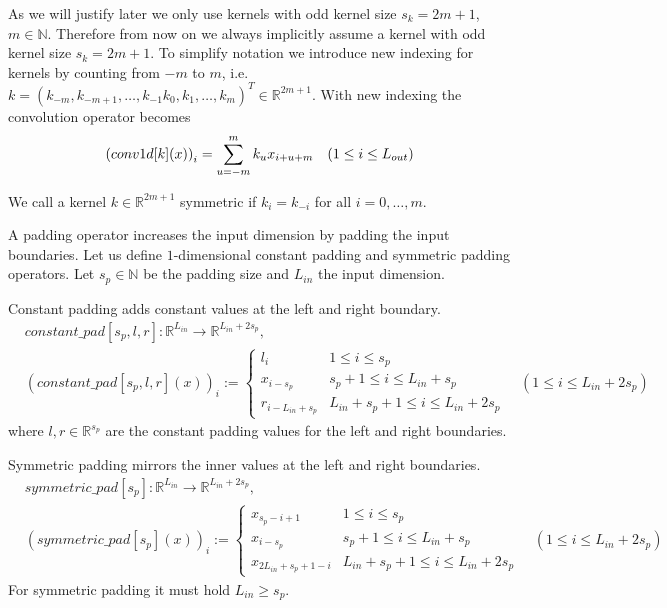 \documentclass[twoside,a4paper]{article}
\begin{document}
As we will justify later we only use kernels with odd kernel size $s_k = 2m+1$, $m \in \mathbb{N}$.
Therefore from now on we always implicitly assume a kernel with odd kernel size $s_k = 2m+1$.
To simplify notation we introduce new indexing for kernels by counting from $-m$ to $m$,
i.e. $k = (k_{-m}, k_{-m+1}, \dots, k_{-1} k_0, k_1, \dots, k_{m})^T \in \mathbb{R}^{2m+1}$.
With new indexing the convolution operator becomes 
\begin{equation*}
	\left( conv1d[k](x) \right)_i = \sum_{u=-m}^{m} k_u x_{i+u+m} \quad
	(1 \leq i \leq L_{out})
\end{equation*}

We call a kernel $k \in \mathbb{R}^{2m+1}$ symmetric if $k_i = k_{-i}$ for all $i = 0, \dots, m$.

A padding operator increases the input dimension by padding
the input boundaries. Let us define $1$-dimensional constant padding and symmetric padding operators.
Let $s_p \in \mathbb{N}$ be the padding size and $L_{in}$ the input dimension.

Constant padding adds constant values at the left and right boundary.
\begin{align*}
	&constant\_pad[s_p,l,r] : \mathbb{R}^{L_{in}} \to \mathbb{R}^{L_{in}+2s_p}, \\[7pt]
	&(constant\_pad[s_p,l,r](x))_i :=
	\begin{cases}
		l_i & 1 \leq i \leq s_p \\
		x_{i-s_p} & s_p+1 \leq i \leq L_{in}+s_p \\
		r_{i-L_{in}+s_p} & L_{in}+s_p+1 \leq i \leq L_{in} + 2s_p
	\end{cases}
	\quad (1 \leq i \leq L_{in}+2s_p)
\end{align*}
where $l,r \in \mathbb{R}^{s_p}$ are the constant padding values for the left and right boundaries.

Symmetric padding mirrors the inner values at the left and right boundaries.
\begin{align*}
	&symmetric\_pad[s_p] : \mathbb{R}^{L_{in}} \to \mathbb{R}^{L_{in}+2s_p}, \\[7pt]
	&(symmetric\_pad[s_p](x))_i :=
	\begin{cases}
		x_{s_p-i+1} & 1 \leq i \leq s_p \\
		x_{i-s_p} & s_p+1 \leq i \leq L_{in}+s_p \\
		x_{2L_{in}+s_p+1-i} & L_{in}+s_p+1 \leq i \leq L_{in} + 2s_p
	\end{cases}
	\quad (1 \leq i \leq L_{in}+2s_p)
\end{align*}
For symmetric padding it must hold $L_{in} \geq s_p$.
\end{document}
